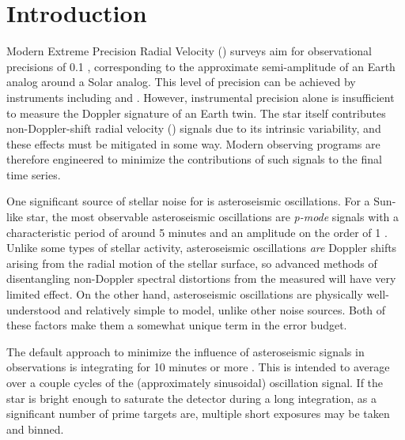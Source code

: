 \documentclass[modern]{aastex62}
\begin{document}
\section{Introduction}
\label{s:intro}

Modern Extreme Precision Radial Velocity (\EPRV) surveys aim for observational precisions of 0.1 \ms, corresponding to the approximate semi-amplitude of an Earth analog around a Solar analog. 
This level of precision can be achieved by instruments including \EXPRES and \ESPRESSO \citep{Petersburg2020, Pepe2021}. 
However, instrumental precision alone is insufficient to measure the Doppler signature of an Earth twin. 
The star itself contributes non-Doppler-shift radial velocity (\RV) signals due to its intrinsic variability, and these effects must be mitigated in some way. 
Modern observing programs are therefore engineered to minimize the contributions of such signals to the final \RV time series.

One significant source of stellar noise for \EPRV is asteroseismic oscillations. 
For a Sun-like star, the most observable asteroseismic oscillations are \textit{p-mode} signals with a characteristic period of around 5 minutes and an amplitude on the order of 1 \ms. 
Unlike some types of stellar activity, asteroseismic oscillations \textit{are} Doppler shifts arising from the radial motion of the stellar surface, so advanced methods of disentangling non-Doppler spectral distortions from the measured \RV will have very limited effect. 
On the other hand, asteroseismic oscillations are physically well-understood and relatively simple to model, unlike other \RV noise sources. 
Both of these factors make them a somewhat unique term in the \EPRV error budget.

The default approach to minimize the influence of asteroseismic signals in \EPRV observations is integrating for 10 minutes or more \citep{Dumusque2011}. 
This is intended to average over a couple cycles of the (approximately sinusoidal) oscillation signal. 
If the star is bright enough to saturate the detector during a long integration, as a significant number of prime \EPRV targets are, multiple short exposures may be taken and binned. 
\end{document}
